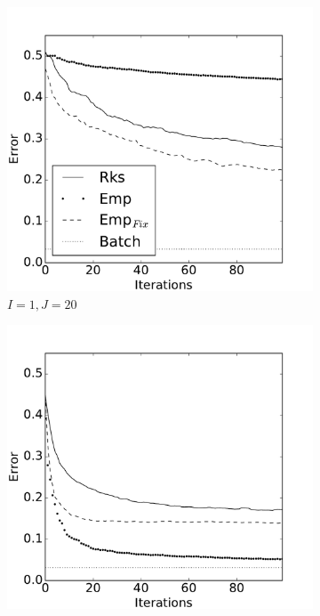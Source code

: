 \documentclass{article} %
\begin{document}
\begin{figure}[!ht]
   \centering
    \begin{subfigure}[b]{0.235\textwidth}
        \includegraphics[width=\textwidth]{imgs/rks_emp_comparison-expand-20-pred-1}
        \caption{$I=1, J=20$}
        \label{fig:expand_20_pred_1}
    \end{subfigure}
    \hfill
    \begin{subfigure}[b]{0.235\textwidth}
        \includegraphics[width=\textwidth]{imgs/rks_emp_comparison-expand-20-pred-50}

\end{subfigure}
\end{figure}
\end{document}
